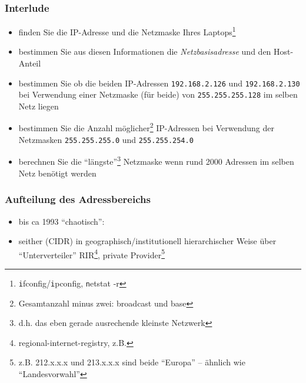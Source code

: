 \documentclass{beamer}
\begin{document}
\begin{frame}
\frametitle{Interlude}
\begin{itemize}
	\item{finden Sie die IP-Adresse und die Netzmaske Ihres Laptops\footnote{{\texttt ifconfig}/{\texttt ipconfig}, {\texttt netstat -r}}}
	\item{bestimmen Sie aus diesen Informationen die {\em Netzbasisadresse} und den Host-Anteil}
	\item{bestimmen Sie ob die beiden IP-Adressen \texttt{192.168.2.126} und \texttt{192.168.2.130} bei Verwendung einer Netzmaske (f\"ur beide) von \texttt{255.255.255.128} im selben Netz liegen}
	\item{bestimmen Sie die Anzahl m\"oglicher\footnote{Gesamtanzahl minus zwei: broadcast und base} IP-Adressen bei Verwendung der Netzmasken \texttt{255.255.255.0} und \texttt{255.255.254.0}}
	\item{berechnen Sie die ``l\"angste''\footnote{d.h. das eben gerade ausrechende kleinste Netzwerk} Netzmaske wenn rund 2000 Adressen im selben Netz ben\"otigt werden}
\end{itemize}
\end{frame}


\begin{frame}
\frametitle{Aufteilung des Adressbereichs}
\begin{itemize}
  \item{bis ca 1993 ``chaotisch'': }
  \item{seither (CIDR) in geographisch/institutionell hierarchischer Weise \"uber ``Unterverteiler'' RIR\footnote{regional-internet-registry, z.B. }, private Provider\footnote{z.B. 212.x.x.x und 213.x.x.x sind beide ``Europa'' -- \"ahnlich wie ``Landesvorwahl''}}
\end{itemize}
\end{frame}
\end{document}
